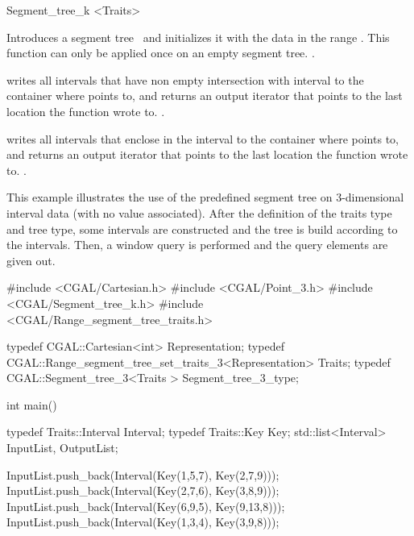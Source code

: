 \begin{ccClassTemplate}{Segment_tree_k
        <Traits>}
\ccOperations

%
{Introduces a segment tree \ccVar\ and initializes it with the data
in the range \ccc{[first, last)}. This function can only be applied
once on an empty segment tree.
\ccPrecond {}.}


%
{writes all intervals that have non empty intersection with interval  to the container
where  points to, and returns an output iterator that points
to the last location the function wrote to.
\ccPrecond  {}.}

%
{writes all intervals that enclose in the interval  to the container
where  points to, and returns an output iterator that points
to the last location the function wrote to.
\ccPrecond  {}.}


\ccExample

This example illustrates the use of the predefined segment tree
on 3-dimensional interval data (with no value associated). After
the definition of the traits type and tree type, some intervals
are constructed and the tree is build according to the
intervals. Then, a window query is performed and the query
elements are given out.

\begin{cprog}
#include <CGAL/Cartesian.h>
#include <CGAL/Point_3.h>
#include <CGAL/Segment_tree_k.h>
#include <CGAL/Range_segment_tree_traits.h>

typedef CGAL::Cartesian<int> Representation;
typedef CGAL::Range_segment_tree_set_traits_3<Representation> Traits;
typedef CGAL::Segment_tree_3<Traits > Segment_tree_3_type;

int main()
{
  typedef Traits::Interval Interval;
  typedef Traits::Key Key;
  std::list<Interval> InputList, OutputList;

  InputList.push_back(Interval(Key(1,5,7), Key(2,7,9)));
  InputList.push_back(Interval(Key(2,7,6), Key(3,8,9)));
  InputList.push_back(Interval(Key(6,9,5), Key(9,13,8)));
  InputList.push_back(Interval(Key(1,3,4), Key(3,9,8)));
 
}
\end{cprog}
\end{ccClassTemplate}
